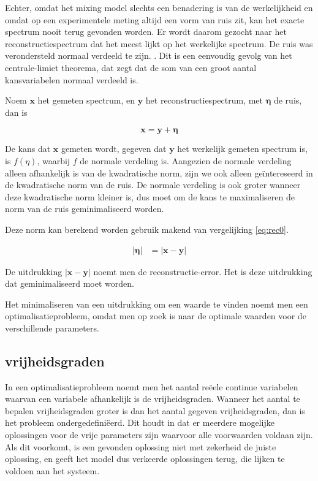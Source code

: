 \documentclass[12pt]{report}
\begin{document}
Echter, omdat het mixing model slechts een benadering is van de werkelijkheid en omdat op een experimentele meting altijd een vorm van ruis zit, kan het exacte spectrum nooit terug gevonden worden. Er wordt daarom gezocht naar het reconstructiespectrum dat het meest lijkt op het werkelijke spectrum. De ruis was verondersteld normaal verdeeld te zijn. . Dit is een eenvoudig gevolg van het centrale-limiet theorema, dat zegt dat de som van een groot aantal kansvariabelen normaal verdeeld is. 

Noem $\bm{x}$ het gemeten spectrum, en $\bm{y}$ het reconstructiespectrum, met $\bm{\eta}$ de ruis, dan is

\begin{equation}\label{eq:rec0}
\bm{x} = \bm{y} + \bm{\eta}
\end{equation}

De kans dat $\bm{x}$ gemeten wordt, gegeven dat $\bm{y}$ het werkelijk gemeten spectrum is, is $f(\eta)$, waarbij $f$ de normale verdeling is. Aangezien de normale verdeling alleen afhankelijk is van de kwadratische norm, zijn we ook alleen ge\"intereseerd in de kwadratische norm van de ruis. De normale verdeling is ook groter wanneer deze kwadratische norm kleiner is, dus moet om de kans te maximaliseren de norm van de ruis geminimaliseerd worden. 

Deze norm kan berekend worden gebruik makend van vergelijking \ref{eq:rec0}.

\begin{eqnarray}
\left|\bm{\eta}\right| &= \left|\bm{x} - \bm{y}\right| \label{eq:rec}
\end{eqnarray}

De uitdrukking $\left|\bm{x} - \bm{y}\right|$ noemt men de reconstructie-error. Het is deze uitdrukking dat geminimaliseerd moet worden.

Het minimaliseren van een uitdrukking om een waarde te vinden noemt men een optimalisatieprobleem, omdat men op zoek is naar de optimale waarden voor de verschillende parameters.

\subsection{vrijheidsgraden}

In een optimalisatieprobleem noemt men het aantal re\"eele continue variabelen waarvan een variabele afhankelijk is de vrijheidsgraden. Wanneer het aantal te bepalen vrijheidsgraden groter is dan het aantal gegeven vrijheidsgraden, dan is het probleem ondergedefini\"eerd. Dit houdt in dat er meerdere mogelijke oplossingen voor de vrije parameters zijn waarvoor alle voorwaarden voldaan zijn. Als dit voorkomt, is een gevonden oplossing niet met zekerheid de juiste oplossing, en geeft het model dus verkeerde oplossingen terug, die lijken te voldoen aan het systeem.
\end{document}
